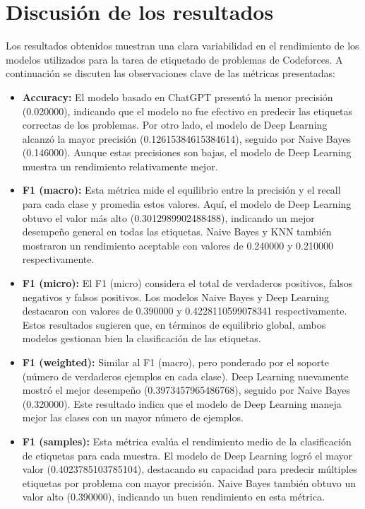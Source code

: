 \documentclass{article}
\begin{document}
\section{Discusión de los resultados}
Los resultados obtenidos muestran una clara variabilidad en el rendimiento de los modelos utilizados para la tarea de etiquetado de problemas de Codeforces. A continuación se discuten las observaciones clave de las métricas presentadas:

\begin{itemize}
    \item \textbf{Accuracy:} El modelo basado en ChatGPT presentó la menor precisión (0.020000), indicando que el modelo no fue efectivo en predecir las etiquetas correctas de los problemas. Por otro lado, el modelo de Deep Learning alcanzó la mayor precisión (0.12615384615384614), seguido por Naive Bayes (0.146000). Aunque estas precisiones son bajas, el modelo de Deep Learning muestra un rendimiento relativamente mejor.

    \item \textbf{F1 (macro):} Esta métrica mide el equilibrio entre la precisión y el recall para cada clase y promedia estos valores. Aquí, el modelo de Deep Learning obtuvo el valor más alto (0.3012989902488488), indicando un mejor desempeño general en todas las etiquetas. Naive Bayes y KNN también mostraron un rendimiento aceptable con valores de 0.240000 y 0.210000 respectivamente.

    \item \textbf{F1 (micro):} El F1 (micro) considera el total de verdaderos positivos, falsos negativos y falsos positivos. Los modelos Naive Bayes y Deep Learning destacaron con valores de 0.390000 y 0.4228110599078341 respectivamente. Estos resultados sugieren que, en términos de equilibrio global, ambos modelos gestionan bien la clasificación de las etiquetas.

    \item \textbf{F1 (weighted):} Similar al F1 (macro), pero ponderado por el soporte (número de verdaderos ejemplos en cada clase). Deep Learning nuevamente mostró el mejor desempeño (0.3973457965486768), seguido por Naive Bayes (0.320000). Este resultado indica que el modelo de Deep Learning maneja mejor las clases con un mayor número de ejemplos.

    \item \textbf{F1 (samples):} Esta métrica evalúa el rendimiento medio de la clasificación de etiquetas para cada muestra. El modelo de Deep Learning logró el mayor valor (0.4023785103785104), destacando su capacidad para predecir múltiples etiquetas por problema con mayor precisión. Naive Bayes también obtuvo un valor alto (0.390000), indicando un buen rendimiento en esta métrica.

\end{itemize}
\end{document}

